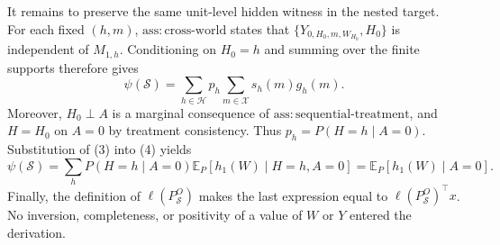 It remains to preserve the same unit-level hidden witness in the nested target.
For each fixed \((h,m)\), \(\mathrm{ass{:}cross\text{-}world}\) states that
\(\{Y_{0,H_0,m,W_{H_0}},H_0\}\) is independent of \(M_{1,h}\).  Conditioning
on \(H_0=h\) and summing over the finite supports therefore gives
\[
 \psi(\mathcal S)
 =\sum_{h\in\mathcal H}p_h\sum_{m\in\mathcal X}s_h(m)g_h(m).
 \tag{4}
\]
Moreover, \(H_0\perp A\) is a marginal consequence of
\(\mathrm{ass{:}sequential\text{-}treatment}\), and
\(H=H_0\) on \(A=0\) by treatment consistency.  Thus
\(p_h=P(H=h\mid A=0)\).  Substitution of (3) into (4) yields
\[
 \psi(\mathcal S)=\sum_hP(H=h\mid A=0)
 \mathbb E_P[h_1(W)\mid H=h,A=0]
 =\mathbb E_P[h_1(W)\mid A=0].
\]
Finally, the definition of \(\ell(P_{\mathcal S}^O)\) makes the last expression
equal to \(\ell(P_{\mathcal S}^O)^\top x\).  No inversion, completeness, or
positivity of a value of \(W\) or \(Y\) entered the derivation.